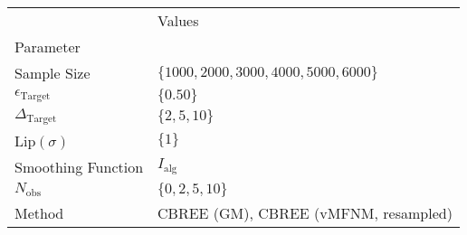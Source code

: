 \begin{tabular}{ll}
 & Values \\
Parameter &  \\
Sample Size & $\{ 1000, 2000, 3000, 4000, 5000, 6000 \}$ \\
\cline{1-2}
$\epsilon_{{\text{{Target}}}}$ & $\{ 0.50 \}$ \\
\cline{1-2}
$\Delta_{{\text{{Target}}}}$ & $\{ 2, 5, 10 \}$ \\
\cline{1-2}
Lip$(\sigma)$ & $\{ 1 \}$ \\
\cline{1-2}
Smoothing Function & $I_\text{alg}$ \\
\cline{1-2}
$N_{{ \text{{obs}} }}$ & $\{ 0, 2, 5, 10 \}$ \\
\cline{1-2}
Method & CBREE (GM), CBREE (vMFNM, resampled) \\
\cline{1-2}
\end{tabular}
